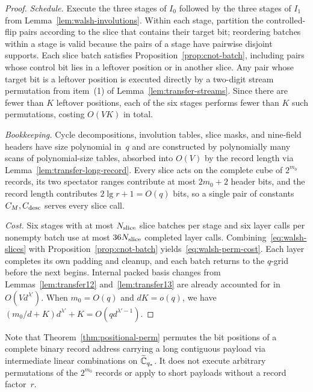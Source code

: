 \begin{proof}
\emph{Schedule.} Execute the three stages of $I_0$ followed by the three stages of $I_1$ from
Lemma~\ref{lem:walsh-involutions}. Within each stage, partition the controlled-flip pairs according to the slice that
contains their target bit; reordering batches within a stage is valid because the pairs of a stage have pairwise
disjoint supports. Each slice batch satisfies Proposition~\ref{prop:cnot-batch}, including pairs whose control bit lies
in a leftover position or in another slice. Any pair whose target bit is a leftover position is executed directly by a
two-digit stream permutation from item~(1) of Lemma~\ref{lem:transfer-streams}. Since there are fewer than $K$ leftover positions,
each of the six stages performs fewer than $K$ such permutations, costing $O(VK)$ in total.

\emph{Bookkeeping.} Cycle decompositions, involution tables, slice masks, and nine-field headers have size polynomial
in~$q$ and are constructed by polynomially many scans of polynomial-size tables, absorbed into $O(V)$ by the record
length via Lemma~\ref{lem:transfer-long-record}. Every slice acts on the complete cube of $2^{m_0}$ records, its two
spectator ranges contribute at most $2m_0+2$ header bits, and the record length contributes $2\lg r+1=O(q)$ bits, so a
single pair of constants $C_M,C_{\rm desc}$ serves every slice call.

\emph{Cost.} Six stages with at most $N_{\rm slice}$ slice batches per stage and six layer calls per nonempty batch use
at most $36N_{\rm slice}$ completed layer calls. Combining~\eqref{eq:walsh-slices} with Proposition~\ref{prop:cnot-batch}
yields~\eqref{eq:walsh-perm-cost}. Each layer completes its own padding and cleanup, and each batch returns to the
$q$-grid before the next begins. Internal packed basis changes from Lemmas~\ref{lem:transfer12}
and~\ref{lem:transfer13} are already accounted for in $O(Vd^{\lambda'})$. When $m_0=O(q)$ and $dK=o(q)$, we have
$(m_0/d+K)d^{\lambda'}+K=O(qd^{\lambda'-1})$.
\end{proof}

Note that Theorem~\ref{thm:positional-perm} permutes the bit positions of a complete binary record address carrying a
long contiguous payload via intermediate linear combinations on $\widetilde{\mathbb{C}}_{q_*}$. It does not execute arbitrary permutations
of the $2^{m_0}$ records or apply to short payloads without a record factor~$r$.

